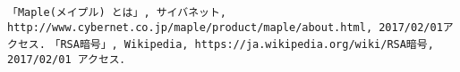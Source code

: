 \begin{thebibliography}{99}
  \verb|「Maple(メイプル) とは」, サイバネット, http://www.cybernet.co.jp/maple/product/maple/about.html, 2017/02/01アクセス.|
  \verb|「RSA暗号」, Wikipedia, https://ja.wikipedia.org/wiki/RSA暗号, 2017/02/01 アクセス．|\end{thebibliography}
